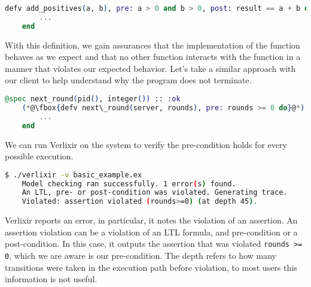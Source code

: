 \begin{lstlisting}[language=Elixir, xleftmargin=.0\linewidth, caption={Example usage of pre- and post-conditions in LTLixir}]
    defv add_positives(a, b), pre: a > 0 and b > 0, post: result == a + b do
        ...
    end
\end{lstlisting}
With this definition, we gain assurances that the implementation of the function behaves as we expect and that no other function interacts with the function in a manner that violates our expected behavior. Let's take a similar approach with our client to help understand why the program does not terminate.
\begin{lstlisting}[language=Elixir, xleftmargin=.3\linewidth]
    @spec next_round(pid(), integer()) :: :ok
    (*@\fbox{defv next\_round(server, rounds), pre: rounds >= 0 do}@*)
        ...
    end
\end{lstlisting}
We can run Verlixir on the system to verify the pre-condition holds for every possible execution.
\begin{lstlisting}[language=bash, xleftmargin=.1\linewidth]
    $ ./verlixir -v basic_example.ex
    Model checking ran successfully. 1 error(s) found.
    An LTL, pre- or post-condition was violated. Generating trace.
    Violated: assertion violated (rounds>=0) (at depth 45).
\end{lstlisting}
Verlixir reports an error, in particular, it notes the violation of an assertion. An assertion violation can be a violation of an LTL formula, and pre-condition or a post-condition. In this case, it outputs the assertion that was violated \texttt{rounds >= 0}, which we are aware is our pre-condition. The depth refers to how many transitions were taken in the execution path before violation, to most users this information is not useful.

